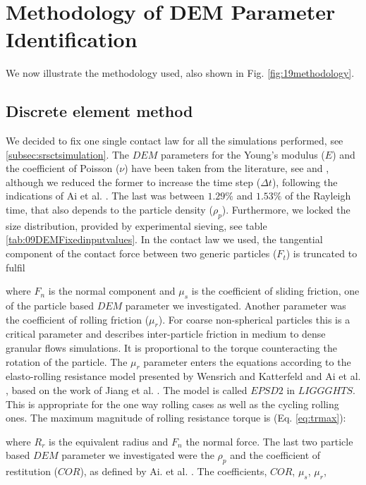 \section{Methodology of DEM Parameter Identification}
\label{sec:methodology}

We now illustrate the methodology used, also shown in Fig.
\ref{fig:19methodology}.

\subsection{Discrete element method}
\label{subsec:dem}

We decided to fix one single
contact law for all the simulations performed, see
\ref{subsec:srsctsimulation}.
The $DEM$ parameters for the Young's modulus ($E$) and the coefficient of Poisson ($\nu$) 
have been taken from the literature, see \cite{RefWorks:175} and \cite{RefWorks:176}, 
although we reduced the former to increase the time step ($\Delta t$), following
the indications of Ai et al. \cite{RefWorks:131}.
The last was between $1.29 \%$ and $1.53 \%$ of the Rayleigh time, that also
depends to the particle density ($\rho_p$).
Furthermore, we locked the size distribution, provided by experimental sieving,
see table \ref{tab:09DEMFixedinputvalues}.
In the contact law we used, 
the tangential component of the contact force between two generic particles
($F_t$) is truncated to fulfil

where $F_n$ is the normal component and $\mu_s$ is the coefficient of sliding
friction, one of the particle based $DEM$ parameter we investigated. 
Another parameter was the coefficient of rolling friction ($\mu_r$). 
For coarse non-spherical particles this is a critical parameter and describes
inter-particle friction in medium to dense granular flows simulations. It is proportional to the 
torque counteracting the rotation of the particle. The $\mu_r$ parameter enters the 
equations according to the elasto-rolling resistance model presented by Wensrich and 
Katterfeld \cite{RefWorks:87} and Ai et al. \cite{RefWorks:131}, 
based on the work of Jiang et al. \cite{RefWorks:143}. 
The model is called $EPSD2$ in $LIGGGHTS$. This is appropriate for the one way
rolling cases as well as the cycling rolling ones.
The maximum magnitude of rolling resistance torque is (Eq. \ref{eq:trmax}):

where $R_r$ is the equivalent radius and $F_n$ the normal force.
The last two particle based $DEM$ parameter we investigated were the $\rho_p$
and the coefficient of restitution ($COR$), as defined by Ai. et al. \cite{RefWorks:131}.
The coefficients, $COR$, $\mu_s$, $\mu_r$,
